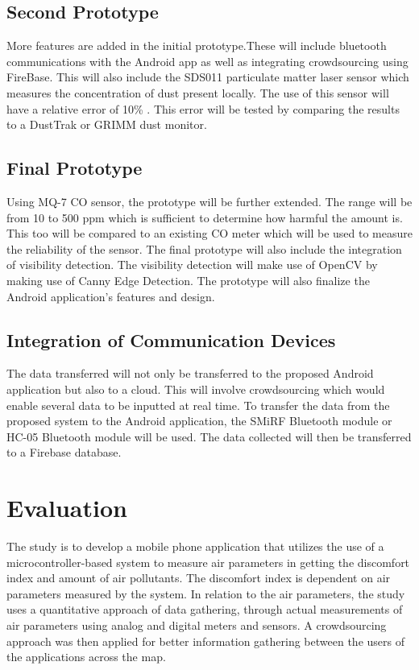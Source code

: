 \subsection{Second Prototype}
More features are added in the initial prototype.These will include bluetooth communications with the Android app as well as integrating crowdsourcing using FireBase. This will also include the SDS011 particulate matter laser sensor which measures the concentration of dust present locally. The use of this sensor will have a relative error of 10\% . This error will be tested by comparing the results to a DustTrak or GRIMM dust monitor.

\subsection{Final Prototype} 
Using  MQ-7 CO sensor, the prototype will be further extended. The range will be from 10 to 500 ppm which is sufficient to determine how harmful the amount is. This too will be compared to an existing CO meter which will be used to measure the reliability of the sensor. The final prototype will also include the integration of visibility detection. The visibility detection will make use of OpenCV by making use of Canny Edge Detection. The prototype will also finalize the Android application's features and design.

\subsection{Integration of Communication Devices}
The data transferred will not only be transferred to the proposed Android application but also to a cloud. This will involve crowdsourcing which would enable several data to be inputted at real time. To transfer the data from the proposed system to the Android application, the SMiRF Bluetooth module or HC-05 Bluetooth module will be used. The data collected will then be transferred to a Firebase database. 

\section{Evaluation}

The study is to develop a mobile phone application that utilizes the use of a microcontroller-based system to measure air parameters in getting the discomfort index and amount of air pollutants. The discomfort index is dependent on air parameters measured by the system. In relation to the air parameters, the study uses a quantitative approach of data gathering, through actual measurements of air parameters using analog and digital meters and sensors. A crowdsourcing approach was then applied for better information gathering between the users of the applications across the map. 

